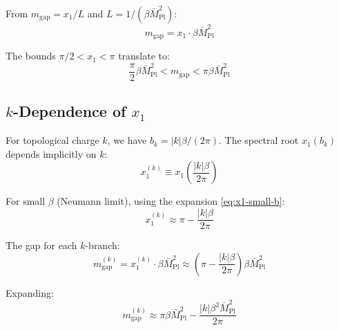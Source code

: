 \documentclass[11pt,a4paper]{article}
\begin{document}
From $m_{\text{gap}} = x_1/L$ and $L = 1/(\beta \bar{M}_{\text{Pl}}^2)$:
\begin{equation}
  m_{\text{gap}} = x_1 \cdot \beta \bar{M}_{\text{Pl}}^2
  \label{eq:gap-beta-1}
\end{equation}

The bounds $\pi/2 < x_1 < \pi$ translate to:
\begin{equation}
  \frac{\pi}{2} \beta \bar{M}_{\text{Pl}}^2 < m_{\text{gap}} < \pi \beta \bar{M}_{\text{Pl}}^2
  \label{eq:gap-bounds-beta}
\end{equation}

\subsection{$k$-Dependence of $x_1$}

For topological charge $k$, we have $b_k = |k| \beta / (2\pi)$. The spectral
root $x_1(b_k)$ depends implicitly on $k$:
\begin{equation}
  x_1^{(k)} \equiv x_1\left( \frac{|k| \beta}{2\pi} \right)
  \label{eq:x1-k-def}
\end{equation}

For small $\beta$ (Neumann limit), using the expansion \eqref{eq:x1-small-b}:
\begin{equation}
  x_1^{(k)} \approx \pi - \frac{|k| \beta}{2\pi}
  \label{eq:x1-k-small}
\end{equation}

The gap for each $k$-branch:
\begin{equation}
  m_{\text{gap}}^{(k)} = x_1^{(k)} \cdot \beta \bar{M}_{\text{Pl}}^2
                       \approx \left( \pi - \frac{|k| \beta}{2\pi} \right) \beta \bar{M}_{\text{Pl}}^2
  \label{eq:gap-k-approx}
\end{equation}

Expanding:
\begin{equation}
  m_{\text{gap}}^{(k)} \approx \pi \beta \bar{M}_{\text{Pl}}^2 - \frac{|k| \beta^2 \bar{M}_{\text{Pl}}^2}{2\pi}
  \label{eq:gap-k-expanded}
\end{equation}
\end{document}
